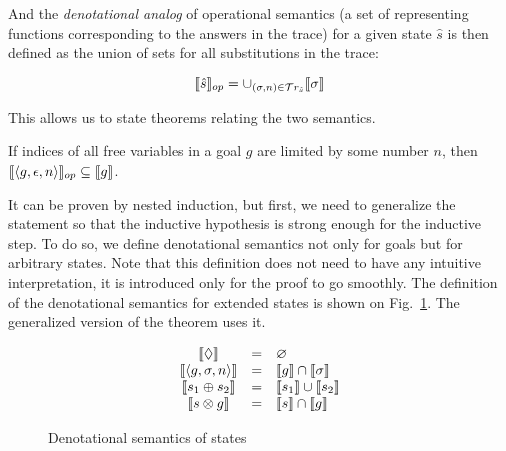 And the \emph{denotational analog} of operational semantics (a set of representing functions corresponding to the answers in the trace) for a given state $\hat{s}$ is
then defined as the union of sets for all substitutions in the trace:

\[
\llbracket{\hat{s}}\rrbracket_{op} = \cup_{(\sigma, n) \in \mathcal{T}r_{\hat{s}}} \llbracket{\sigma}\rrbracket
\]

\begin{comment}
In \textsc{Coq} we again use a proposition instead:

\begin{lstlisting}[language=Coq]
   Definition in_denotational_analog
      (t : trace) (f : repr_fun) : Prop :=
      exists s n, in_stream (Answer s n) t /\
             in_denotational_sem_subst s f.
   Notation "{| t , f |}" := (in_denotational_analog t f).
\end{lstlisting}
\end{comment}

This allows us to state theorems relating the two semantics.

\begin{theorem}
\label{lem:soundness}
If indices of all free variables in a goal $g$ are limited by some number $n$, then $\llbracket{\left<{g, \epsilon, n}\right>}\rrbracket_{op} \subseteq \llbracket{g}\rrbracket$.
\end{theorem}

It can be proven by nested induction, but first, we need to generalize the statement so that the inductive hypothesis is strong enough for the inductive step.
To do so, we define denotational semantics not only for goals but for arbitrary states. Note that this definition does not need to have any intuitive
interpretation, it is introduced only for the proof to go smoothly. The definition of the denotational semantics for extended states is shown on Fig.~\ref{denotational_semantics_of_states}.
The generalized version of the theorem uses it.

\begin{figure}[t]
  \[
  \begin{array}{ccl}
    \llbracket{\Diamond}\rrbracket&=&\varnothing\\
    \llbracket{\left<{g, \sigma, n}\right>}\rrbracket&=&\llbracket{g}\rrbracket\cap\llbracket{\sigma}\rrbracket\\
    \llbracket{s_1 \oplus s_2}\rrbracket&=&\llbracket{s_1}\rrbracket\cup\llbracket{s_2}\rrbracket\\
    \llbracket{s \otimes g}\rrbracket&=&\llbracket{s}\rrbracket\cap\llbracket{g}\rrbracket\\
  \end{array}
  \]
  \caption{Denotational semantics of states}
  \label{denotational_semantics_of_states}
\end{figure}

